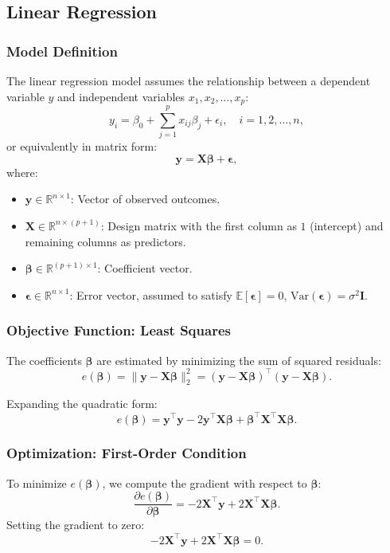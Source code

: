 \documentclass[12pt,a4paper]{article}
\begin{document}
\subsection{Linear Regression}

\subsubsection{Model Definition}
The linear regression model assumes the relationship between a dependent variable \( y \) and independent variables \( x_1, x_2, \dots, x_p \):
\[
y_i = \beta_0 + \sum_{j=1}^p x_{ij} \beta_j + \epsilon_i, \quad i = 1, 2, \dots, n,
\]
or equivalently in matrix form:
\[
\mathbf{y} = \mathbf{X} \boldsymbol{\beta} + \boldsymbol{\epsilon},
\]
where:
\begin{itemize}
    \item \( \mathbf{y} \in \mathbb{R}^{n \times 1} \): Vector of observed outcomes.
    \item \( \mathbf{X} \in \mathbb{R}^{n \times (p+1)} \): Design matrix with the first column as \( 1 \) (intercept) and remaining columns as predictors.
    \item \( \boldsymbol{\beta} \in \mathbb{R}^{(p+1) \times 1} \): Coefficient vector.
    \item \( \boldsymbol{\epsilon} \in \mathbb{R}^{n \times 1} \): Error vector, assumed to satisfy \( \mathbb{E}[\boldsymbol{\epsilon}] = 0 \), \( \text{Var}(\boldsymbol{\epsilon}) = \sigma^2 \mathbf{I} \).
\end{itemize}

\subsubsection{Objective Function: Least Squares}
The coefficients \( \boldsymbol{\beta} \) are estimated by minimizing the sum of squared residuals:
\[
e(\boldsymbol{\beta}) = \|\mathbf{y} - \mathbf{X}\boldsymbol{\beta}\|_2^2 = (\mathbf{y} - \mathbf{X}\boldsymbol{\beta})^\top (\mathbf{y} - \mathbf{X}\boldsymbol{\beta}).
\]

Expanding the quadratic form:
\[
e(\boldsymbol{\beta}) = \mathbf{y}^\top \mathbf{y} - 2 \mathbf{y}^\top \mathbf{X}\boldsymbol{\beta} + \boldsymbol{\beta}^\top \mathbf{X}^\top \mathbf{X} \boldsymbol{\beta}.
\]

\subsubsection{Optimization: First-Order Condition}
To minimize \( e(\boldsymbol{\beta}) \), we compute the gradient with respect to \( \boldsymbol{\beta} \):
\[
\frac{\partial e(\boldsymbol{\beta})}{\partial \boldsymbol{\beta}} = -2 \mathbf{X}^\top \mathbf{y} + 2 \mathbf{X}^\top \mathbf{X} \boldsymbol{\beta}.
\]
Setting the gradient to zero:
\[
-2 \mathbf{X}^\top \mathbf{y} + 2 \mathbf{X}^\top \mathbf{X} \boldsymbol{\beta} = 0.
\]
\end{document}
